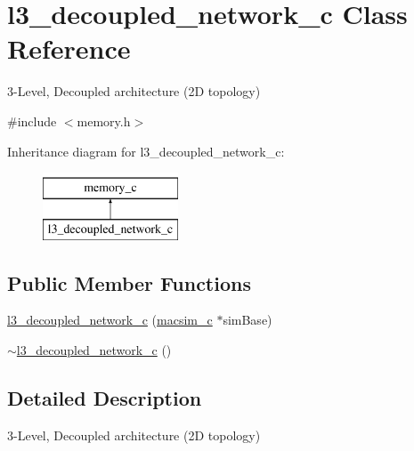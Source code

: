 \hypertarget{classl3__decoupled__network__c}{
\section{l3\_\-decoupled\_\-network\_\-c Class Reference}
\label{classl3__decoupled__network__c}
}


3-\/Level, Decoupled architecture (2D topology)  




{\ttfamily \#include $<$memory.h$>$}

Inheritance diagram for l3\_\-decoupled\_\-network\_\-c:\begin{figure}[H]
\begin{center}
\leavevmode
\includegraphics[height=2.000000cm]{classl3__decoupled__network__c}
\end{center}
\end{figure}
\subsection*{Public Member Functions}
\begin{DoxyCompactItemize}
\item 
\hyperlink{classl3__decoupled__network__c_ace5198d467bcf99580a9c593426249a1}{l3\_\-decoupled\_\-network\_\-c} (\hyperlink{classmacsim__c}{macsim\_\-c} $\ast$simBase)
\item 
\hyperlink{classl3__decoupled__network__c_a2b4f7f32f1a19c56449fa9cbbae15cbf}{$\sim$l3\_\-decoupled\_\-network\_\-c} ()
\end{DoxyCompactItemize}


\subsection{Detailed Description}
3-\/Level, Decoupled architecture (2D topology) 

